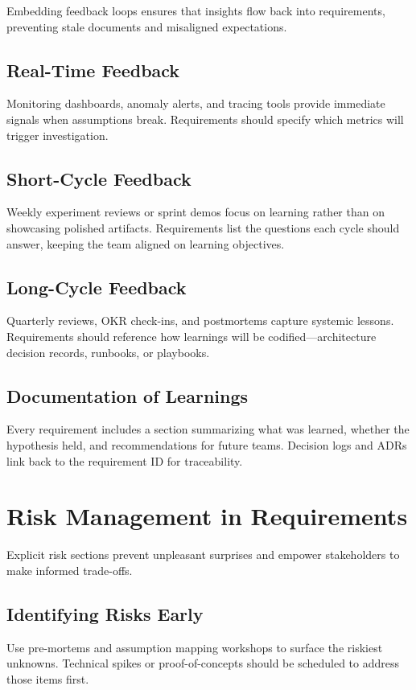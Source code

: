 Embedding feedback loops ensures that insights flow back into requirements, preventing stale documents and misaligned expectations.

\subsection{Real-Time Feedback}
Monitoring dashboards, anomaly alerts, and tracing tools provide immediate signals when assumptions break. Requirements should specify which metrics will trigger investigation.

\subsection{Short-Cycle Feedback}
Weekly experiment reviews or sprint demos focus on learning rather than on showcasing polished artifacts. Requirements list the questions each cycle should answer, keeping the team aligned on learning objectives.

\subsection{Long-Cycle Feedback}
Quarterly reviews, OKR check-ins, and postmortems capture systemic lessons. Requirements should reference how learnings will be codified—architecture decision records, runbooks, or playbooks.

\subsection{Documentation of Learnings}
Every requirement includes a section summarizing what was learned, whether the hypothesis held, and recommendations for future teams. Decision logs and ADRs link back to the requirement ID for traceability.

\section{Risk Management in Requirements}
\label{sec:risk-requirements}

Explicit risk sections prevent unpleasant surprises and empower stakeholders to make informed trade-offs.

\subsection{Identifying Risks Early}
Use pre-mortems and assumption mapping workshops to surface the riskiest unknowns. Technical spikes or proof-of-concepts should be scheduled to address those items first.


